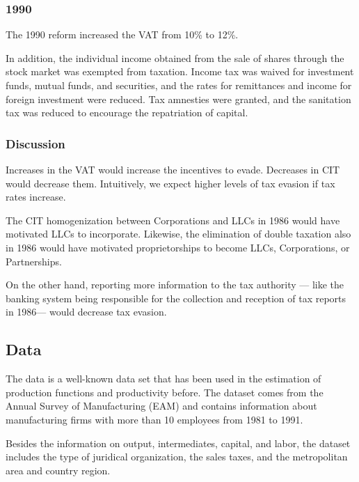 \documentclass[
  12pt]{article}
\theoremstyle{definition}
\theoremstyle{remark}
\begin{document}
\subsubsection{1990}\label{section-2}

The 1990 reform increased the VAT from 10\% to 12\%.

In addition, the individual income obtained from the sale of shares
through the stock market was exempted from taxation. Income tax was
waived for investment funds, mutual funds, and securities, and the rates
for remittances and income for foreign investment were reduced. Tax
amnesties were granted, and the sanitation tax was reduced to encourage
the repatriation of capital.

\subsubsection{Discussion}\label{discussion-1}

Increases in the VAT would increase the incentives to evade. Decreases
in CIT would decrease them. Intuitively, we expect higher levels of tax
evasion if tax rates increase.

The CIT homogenization between Corporations and LLCs in 1986 would have
motivated LLCs to incorporate. Likewise, the elimination of double
taxation also in 1986 would have motivated proprietorships to become
LLCs, Corporations, or Partnerships.

On the other hand, reporting more information to the tax authority ---
like the banking system being responsible for the collection and
reception of tax reports in 1986--- would decrease tax evasion.

\subsection{Data}\label{data}

The data is a well-known data set that has been used in the estimation
of production functions and productivity before. The dataset comes from
the Annual Survey of Manufacturing (EAM) and contains information about
manufacturing firms with more than 10 employees from 1981 to 1991.

Besides the information on output, intermediates, capital, and labor,
the dataset includes the type of juridical organization, the sales
taxes, and the metropolitan area and country region.
\end{document}
